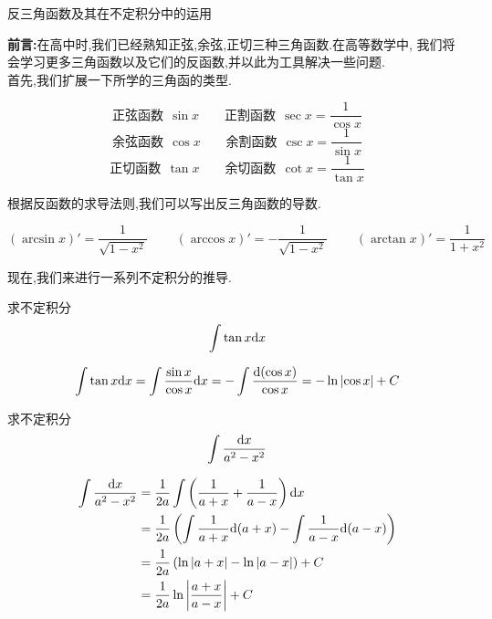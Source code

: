 \documentclass{ctexart}
\begin{document}
\pagestyle{empty}
\begin{center}\large
    反三角函数及其在不定积分中的运用
\end{center}
\textbf{前言:}在高中时,我们已经熟知正弦,余弦,正切三种三角函数.在高等数学中,
我们将会学习更多三角函数以及它们的反函数,并以此为工具解决一些问题.\\
首先,我们扩展一下所学的三角函的类型.
\begin{theorem}[六种三角函数]
        $$\text{正弦函数}\ \ \sin x\ \ \ \ \ \ \ \ \ \text{正割函数}\ \ \sec{x}=\dfrac{1}{\cos{x}}$$
        $$\text{余弦函数}\ \ \cos x\ \ \ \ \ \ \ \ \ \text{余割函数}\ \ \csc{x}=\dfrac{1}{\sin{x}}$$
        $$\text{正切函数}\ \ \tan x\ \ \ \ \ \ \ \ \ \text{余切函数}\ \ \cot{x}=\dfrac{1}{\tan{x}}$$
\end{theorem}\noindent
根据反函数的求导法则,我们可以写出反三角函数的导数.
\begin{theorem}[反三角函数的导数]
    $$\left(\arcsin x\right)'=\dfrac{1}{\sqrt{1-x^2}}\ \ \ \ \ \ \ \ \ \ \left(\arccos x\right)'=-\dfrac{1}{\sqrt{1-x^2}}\ \ \ \ \ \ \ \ \ \ \left(\arctan x\right)'=\dfrac{1}{1+x^2}$$
\end{theorem}\noindent
现在,我们来进行一系列不定积分的推导.
\begin{problem}[Example 1.]
    求不定积分$$\int{\tan{x}\mathrm{d}x}$$
\end{problem}
\begin{solution}[Solution.]
    $$
    \int \tan{x}\mathrm{d} x 
    = \int \dfrac{\sin{x}}{\cos{x}}\mathrm{d} x
    = -\int \dfrac{\mathrm{d}(\cos{x})}{\cos{x}}
    = -\ln\left\lvert{\cos{x}}\right\rvert+C
    $$
\end{solution}
\begin{problem}[Example 2.]
    求不定积分$$\int{\dfrac{\mathrm{d}x}{a^2-x^2}}$$
\end{problem}
\begin{solution}[Solution.]
    $$
    \begin{aligned}
        \int \dfrac{\mathrm{d} x}{a^2-x^2} 
        &= \dfrac{1}{2a}\int\left(\dfrac{1}{a+x}+\dfrac{1}{a-x}\right)\mathrm{d} x\\
        &= \dfrac{1}{2a}\left(\int\dfrac{1}{a+x}\mathrm{d}(a+x)-\int\dfrac{1}{a-x}\mathrm{d}(a-x)\right)\\
        &= \dfrac{1}{2a}\left(\ln\left\lvert a+x\right\rvert-\ln\left\lvert a-x\right\rvert\right)+C\\
        &= \dfrac{1}{2a}\ln{\left\lvert\dfrac{a+x}{a-x}\right\rvert}+C
    \end{aligned}
    $$
\end{solution}
\end{document}
